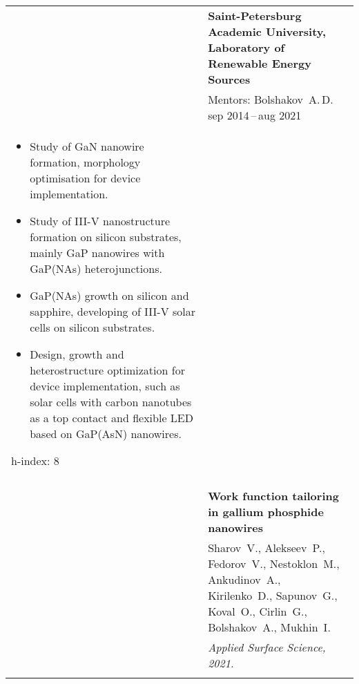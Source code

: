 \documentclass[letterpaper, 11pt]{article}
\begin{document}
\begin{longtable}{p{1.3in}p{4.8in}}
		
		\nohyphens{\color{OliveGreen}{Research experience}}
        & \textbf{Saint-Petersburg Academic University, Laboratory of Renewable
        Energy Sources} \\
		& Mentors: Bolshakov~A.\,D. \hfill sep 2014\,--\,aug 2021 \\
		\begin{itemize}
            \item Study of GaN nanowire formation, morphology optimisation for
                device implementation.
            \item Study of III-V nanostructure formation on silicon substrates,
                mainly GaP nanowires with GaP(NAs) heterojunctions.
            \item GaP(NAs) growth on silicon and sapphire, developing of III-V
                solar cells on silicon substrates.
            \item Design, growth and heterostructure optimization for device
                implementation, such as solar cells with carbon nanotubes as a
                top contact and flexible LED based on GaP(AsN) nanowires.
		\end{itemize}
		
		h-index: 8 \\
		& \\
		
		
		
		
		\nohyphens{\color{OliveGreen}{Q1 Publications}}
        & \textbf{Work function tailoring in gallium phosphide nanowires} \\
        & Sharov~V., Alekseev~P., Fedorov~V., Nestoklon~M., Ankudinov~A.,
        Kirilenko~D., Sapunov~G., Koval~O., Cirlin~G., Bolshakov~A., Mukhin~I.
        \\
		& \textit{Applied Surface Science, 2021.}\\
		& \\


\end{longtable}
\end{document}
